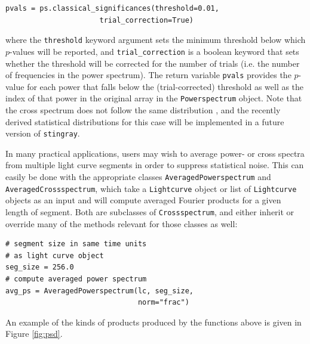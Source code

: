 \documentclass[12pt]{emulateapj}
\newcommand{\stingray}{\texttt{stingray}\xspace}
\newcommand{\lightcurve}{\texttt{Lightcurve}\xspace}
\newcommand{\crossspectrum}{\texttt{Crossspectrum}\xspace}
\newcommand{\powerspectrum}{\texttt{Powerspectrum}\xspace}
\begin{document}
\begin{verbatim}
pvals = ps.classical_significances(threshold=0.01, 
                      trial_correction=True)
\end{verbatim}

\noindent where the \texttt{threshold} keyword argument sets the minimum threshold below which $p$-values will be reported, and \texttt{trial_correction} is a boolean keyword that sets whether the threshold will be corrected for the number of trials (i.e. the number of frequencies in the power spectrum). 
The return variable \texttt{pvals} provides the $p$-value for each power that falls below the (trial-corrected) threshold as well as the index of that power in the original array in the \powerspectrum object.
Note that the cross spectrum does not follow the same distribution \citep{huppenkothen2017}, and the recently derived statistical distributions for this case will be implemented in a future version of \stingray. 

In many practical applications, users may wish to average power- or cross spectra from multiple light curve segments in order to suppress statistical noise. This can easily be done with the appropriate classes \texttt{AveragedPowerspectrum} and \texttt{AveragedCrossspectrum}, which take a \lightcurve object or list of \lightcurve objects as an input and will compute averaged Fourier products for a given length of segment. Both are subclasses of \crossspectrum, and either inherit or override many of the methods relevant for those classes as well:

\begin{verbatim}
# segment size in same time units 
# as light curve object
seg_size = 256.0
# compute averaged power spectrum
avg_ps = AveragedPowerspectrum(lc, seg_size, 
                               norm="frac")
\end{verbatim}

\noindent An example of the kinds of products produced by the functions above is given in Figure \ref{fig:psd}.
\end{document}
